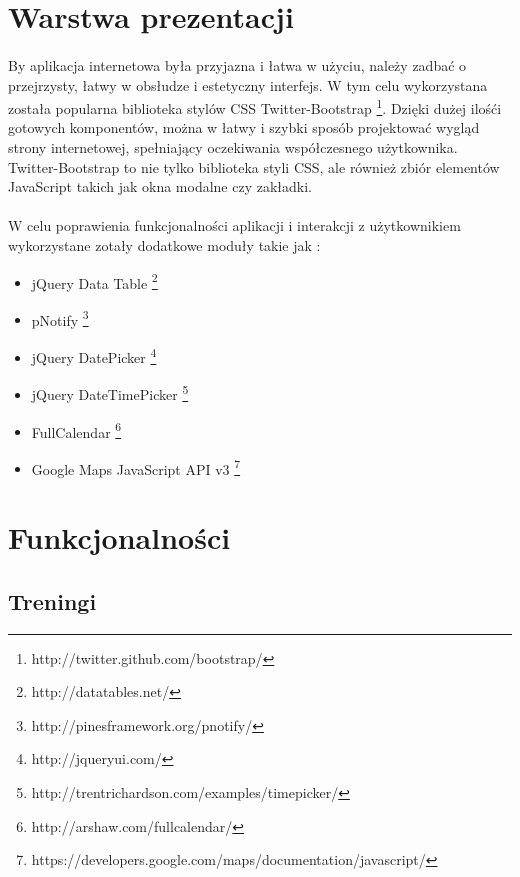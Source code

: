 

\section{Warstwa prezentacji} %
\label{sec:warstwa_aplikacji}
\paragraph{} %
\label{par:}
By aplikacja internetowa była przyjazna i łatwa w użyciu, należy zadbać o przejrzysty, łatwy w obsłudze i estetyczny interfejs. W tym celu wykorzystana została popularna biblioteka stylów CSS Twitter-Bootstrap \footnote{http://twitter.github.com/bootstrap/}. Dzięki dużej ilośći gotowych komponentów, można w łatwy i szybki sposób projektować wygląd strony internetowej, spełniający oczekiwania współczesnego użytkownika. Twitter-Bootstrap to nie tylko biblioteka styli CSS, ale również zbiór elementów JavaScript takich jak okna modalne czy zakładki.

\paragraph{} %
\label{par:}
W celu poprawienia funkcjonalności aplikacji i interakcji z użytkownikiem wykorzystane zotały dodatkowe moduły takie jak :
\begin{itemize}
\item jQuery Data Table \footnote{http://datatables.net/}
\item pNotify \footnote{http://pinesframework.org/pnotify/}
\item jQuery DatePicker \footnote{http://jqueryui.com/}
\item jQuery DateTimePicker \footnote{http://trentrichardson.com/examples/timepicker/}
\item FullCalendar \footnote{http://arshaw.com/fullcalendar/}
\item Google Maps JavaScript API v3 \footnote{https://developers.google.com/maps/documentation/javascript/}
\end{itemize}


\section{Funkcjonalności} %
\label{sec:funkcjonalno_ci}

\subsection{Treningi} %
\label{sub:treningi}


